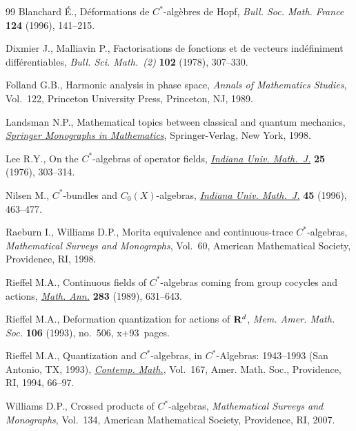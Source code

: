 \documentclass[11pt]{article}
\begin{document}
\begin{thebibliography}{99}
Blanchard {\'E}., D\'eformations de {$C^*$}-alg\`ebres de {H}opf, \textit{Bull.
  Soc. Math. France} \textbf{124} (1996), 141--215.


Dixmier J., Malliavin P., Factorisations de fonctions et de vecteurs
  ind\'ef\/iniment dif\/f\'erentiables, \textit{Bull. Sci. Math.~(2)} \textbf{102}
  (1978), 307--330.

Folland G.B., Harmonic analysis in phase space, \textit{Annals of Mathematics
  Studies}, Vol.~122, Princeton University Press, Princeton, NJ, 1989.

Landsman N.P., Mathematical topics between classical and quantum mechanics,
  \href{http://dx.doi.org/10.1007/978-1-4612-1680-3}{\textit{Springer Monographs in Mathematics}}, Springer-Verlag, New York, 1998.

Lee R.Y., On the {$C^*$}-algebras of operator f\/ields, \href{http://dx.doi.org/10.1512/iumj.1976.25.25026}{\textit{Indiana Univ.
  Math.~J.}} \textbf{25} (1976), 303--314.

Nilsen M., $C^*$-bundles and {$C_0(X)$}-algebras, \href{http://dx.doi.org/10.1512/iumj.1996.45.1086}{\textit{Indiana Univ.
  Math.~J.}} \textbf{45} (1996), 463--477.

Raeburn I., Williams D.P., Morita equivalence and continuous-trace
  {$C^*$}-algebras, \textit{Mathematical Surveys and Monographs}, Vol.~60,
  American Mathematical Society, Providence, RI, 1998.



Rief\/fel M.A., Continuous f\/ields of {$C^*$}-algebras coming from group cocycles
  and actions, \href{http://dx.doi.org/10.1007/BF01442857}{\textit{Math. Ann.}} \textbf{283} (1989), 631--643.

Rief\/fel M.A., Deformation quantization for actions of {${\bf R}^d$},
  \textit{Mem. Amer. Math. Soc.} \textbf{106} (1993), no.~506, x+93~pages.

Rief\/fel M.A., Quantization and {$C^*$}-algebras, in {$C^*$}-Algebras:
  1943--1993 ({S}an {A}ntonio, {TX}, 1993), \href{http://dx.doi.org/10.1090/conm/167/1292010}{\textit{Contemp. Math.}}, Vol.~167,
  Amer. Math. Soc., Providence, RI, 1994, 66--97.

Williams D.P., Crossed products of {$C^*$}-algebras, \textit{Mathematical
  Surveys and Monographs}, Vol.~134, American Mathematical Society, Providence,
  RI, 2007.

\end{thebibliography}
\end{document}
